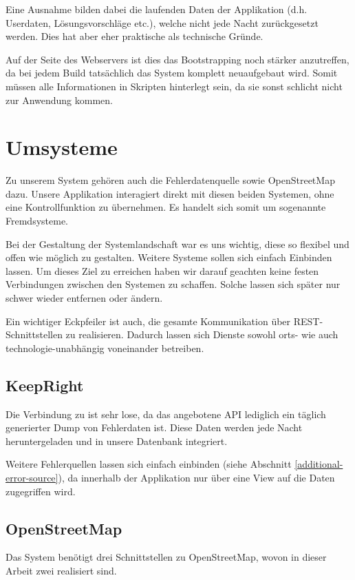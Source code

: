 Eine Ausnahme bilden dabei die laufenden Daten der Applikation (d.h. Userdaten, Lösungsvorschläge etc.), welche nicht jede Nacht zurückgesetzt werden.
Dies hat aber eher praktische als technische Gründe.

Auf der Seite des Webservers ist dies das \gls{Bootstrapping} noch stärker anzutreffen, da bei jedem Build tatsächlich das System komplett neuaufgebaut wird.
Somit müssen alle Informationen in Skripten hinterlegt sein, da sie sonst schlicht nicht zur Anwendung kommen.

\section{Umsysteme}
Zu unserem System gehören auch die Fehlerdatenquelle  sowie \gls{OpenStreetMap} dazu.
Unsere Applikation interagiert direkt mit diesen beiden Systemen, ohne eine Kontrollfunktion zu übernehmen.
Es handelt sich somit um sogenannte Fremdsysteme.

Bei der Gestaltung der Systemlandschaft war es uns wichtig, diese so flexibel und offen wie möglich zu gestalten.
Weitere Systeme sollen sich einfach Einbinden lassen.
Um dieses Ziel zu erreichen haben wir darauf geachten keine festen Verbindungen zwischen den Systemen zu schaffen.
Solche lassen sich später nur schwer wieder entfernen oder ändern.

Ein wichtiger Eckpfeiler ist auch, die gesamte Kommunikation über \gls{REST}-Schnittstellen zu realisieren.
Dadurch lassen sich Dienste sowohl orts- wie auch technologie-unabhängig voneinander betreiben.

\subsection{KeepRight}
Die Verbindung zu  ist sehr lose, da das angebotene \gls{API} lediglich ein täglich generierter Dump von Fehlerdaten ist.
Diese Daten werden jede Nacht heruntergeladen und in unsere Datenbank integriert.

Weitere Fehlerquellen lassen sich einfach einbinden (siehe Abschnitt \ref{additional-error-source}), da innerhalb der Applikation nur über eine View auf die Daten zugegriffen wird.

\subsection{OpenStreetMap}
Das System benötigt drei Schnittstellen zu \gls{OpenStreetMap}, wovon in dieser Arbeit zwei realisiert sind.

